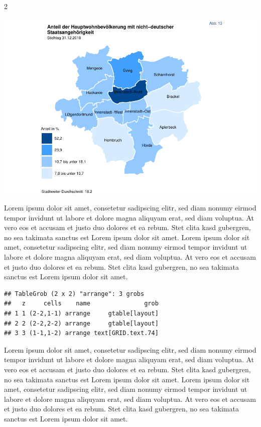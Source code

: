 \documentclass[
  a4paper,
  twoside]{article}
\begin{document}
\begin {multicols}{2}

\includegraphics[width=1\linewidth]{2021-03-02_Beispiel_files/figure-latex/Plot map-1}

Lorem ipsum dolor sit amet, consetetur sadipscing elitr, sed diam nonumy
eirmod tempor invidunt ut labore et dolore magna aliquyam erat, sed diam
voluptua. At vero eos et accusam et justo duo dolores et ea rebum. Stet
clita kasd gubergren, no sea takimata sanctus est Lorem ipsum dolor sit
amet. Lorem ipsum dolor sit amet, consetetur sadipscing elitr, sed diam
nonumy eirmod tempor invidunt ut labore et dolore magna aliquyam erat,
sed diam voluptua. At vero eos et accusam et justo duo dolores et ea
rebum. Stet clita kasd gubergren, no sea takimata sanctus est Lorem
ipsum dolor sit amet. \columnbreak

\begin{verbatim}
## TableGrob (2 x 2) "arrange": 3 grobs
##   z     cells    name               grob
## 1 1 (2-2,1-1) arrange     gtable[layout]
## 2 2 (2-2,2-2) arrange     gtable[layout]
## 3 3 (1-1,1-2) arrange text[GRID.text.74]
\end{verbatim}

Lorem ipsum dolor sit amet, consetetur sadipscing elitr, sed diam nonumy
eirmod tempor invidunt ut labore et dolore magna aliquyam erat, sed diam
voluptua. At vero eos et accusam et justo duo dolores et ea rebum. Stet
clita kasd gubergren, no sea takimata sanctus est Lorem ipsum dolor sit
amet. Lorem ipsum dolor sit amet, consetetur sadipscing elitr, sed diam
nonumy eirmod tempor invidunt ut labore et dolore magna aliquyam erat,
sed diam voluptua. At vero eos et accusam et justo duo dolores et ea
rebum. Stet clita kasd gubergren, no sea takimata sanctus est Lorem
ipsum dolor sit amet.

\end {multicols}
\end{document}
